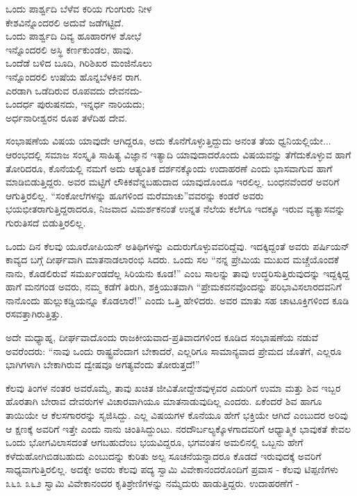 \begin{myquote}
ಒಂದು ಪಾರ್ಶ್ವದಿ ಬೆಳೆವ ಕರಿಯ ಗುಂಗುರು ನೀಳ\\ಕೇಶವಿನ್ನೊಂದರಲಿ ಅದುವೆ ಜಡೆಗಟ್ಟಿದೆ.\\ಒಂದು ಪಾರ್ಶ್ವದಿ ದಿವ್ಯ ಹೂಹಾರಗಳ ಶೋಭೆ\\ಇನ್ನೊಂದರಲಿ ಅಸ್ಥಿ ಕರ್ಣಕುಂಡಲ, ಹಾವು.\\ಒಂದೆಡೆ ಬಳಿದ ಬೂದಿ, ಗಿರಿಶಿಖರ ಮಂಜಿನೊಲು\\ಇನ್ನೊಂದರಲಿ ಉಷೆಯ ಹೊನ್ನಬೆಳಕಿನ ರಾಗ.\\ಎರಡಾಗಿ ಒಡೆದಿರುವ ರೂಪವದು ದೇವನದು-\\ಒಂದರ್ಧ ಪುರುಷನದು, ಇನ್ನರ್ಧ ನಾರಿಯದು;\\ಅರ್ಧನಾರೀಶ್ವರನ ರೂಪ ತಳೆದಿಹ ದೇವ.
\end{myquote}

ಸಂಭಾಷಣೆಯ ವಿಷಯ ಯಾವುದೇ ಆಗಿದ್ದರೂ, ಅದು ಕೊನೆಗೊಳ್ಳುತ್ತಿದ್ದುದು ಅನಂತ ತೆಯ ಧ್ವನಿಯಲ್ಲಿಯೇ... ಆರಂಭದಲ್ಲಿ ಸಮಾಜ ಸಂಸ್ಕೃತಿ ಸಾಹಿತ್ಯ ವಿಜ್ಞಾನ ಇತ್ಯಾದಿ ಯಾವುದಾದರೊಂದು ವಿಷಯವನ್ನು ತೆಗೆದುಕೊಳ್ಳುವ ಹಾಗೆ ತೋರಿದರೂ, ಕೊನೆಯಲ್ಲಿ ನಮಗೆ ಅದು ಆತ್ಯಂತಿಕ ದರ್ಶನಕ್ಕೊಂದು ಉದಾಹರಣೆ ಎಂದು ಭಾಸವಾಗುವ ಹಾಗೆ ಮಾಡಿಬಿಡುತ್ತಿದ್ದರು. ಅವರ ಮಟ್ಟಿಗೆ ಲೌಕಿಕವೆನ್ನಬಹುದಾದ ಯಾವುದೊಂದೂ ಇರಲಿಲ್ಲ. ಬಂಧನವೆಂದರೆ ಅವರಿಗೆ ಆಗುತ್ತಿರಲಿಲ್ಲ. “ಸಂಕೋಲೆಗಳನ್ನು ಹೂಗಳಿಂದ ಮರೆಮಾಚು”ವವರನ್ನು ಕಂಡರೆ ಅವರು ಭಯಭೀತರಾಗುತ್ತಿದ್ದರಾದರೂ, ನಿಜವಾದ ವಿಮರ್ಶಕನಂತೆ ಉನ್ನತ ನೆಲೆಯ ಕಲೆಗೂ ಇದಕ್ಕೂ ಇರುವ ವ್ಯತ್ಯಾಸವನ್ನು ಗುರುತಿಸದೆ ಬಿಡುತ್ತಿರಲಿಲ್ಲ.

ಒಂದು ದಿನ ಕೆಲವು ಯೂರೋಪಿಯನ್ ಅತಿಥಿಗಳನ್ನು ಎದುರುಗೊಳ್ಳುವವರಿದ್ದೆವು. ಇದಕ್ಕಿದ್ದಂತೆ ಅವರು ಪರ್ಷಿಯನ್ ಕಾವ್ಯದ ಬಗ್ಗೆ ದೀರ್ಘವಾಗಿ ಮಾತನಾಡಲಾರಂಭಿ ಸಿದರು. ಒಂದು ಸಲ “ನನ್ನ ಪ್ರೇಮಿಯ ಮುಖದ ಮಚ್ಚೆಯೊಂದಕೆ ನಾನು, ಕೊಡಲಿರುವೆ ಸಮರ್ಖಂಡದೆಲ್ಲ ಸಿರಿಯನು ಕೂಡ!” ಎಂಬ ಸಾಲನ್ನು ತಾವು ಉದ್ಧರಿಸುತ್ತಿರುವುದನ್ನು ಇದ್ದಕ್ಕಿದ್ದ ಹಾಗೆ ಮನಗಂಡ ಅವರು, ನಮ್ಮ ಕಡೆಗೆ ತಿರುಗಿ, ಶಕ್ತಿಯುತವಾಗಿ “ಪ್ರೇಮಕವನವೊಂದನ್ನು ಪರಿಭಾವಿಸಲಾರದವನಿಗೆ ನಾನೊಂದು ಹುಲ್ಲುಕಡ್ಡಿಯನ್ನೂ ಕೊಡಲಾರೆ!” ಎಂದು ಒತ್ತಿ ಹೇಳಿದರು. ಅವರ ಮಾತು ಸಹ ಚಾಟೂಕ್ತಿಗಳಿಂದ ಕೂಡಿ ರಸವತ್ತಾಗಿರುತ್ತಿತ್ತು.

ಅದೇ ಮಧ್ಯಾಹ್ನ, ದೀರ್ಘವಾದೊಂದು ರಾಜಕೀಯವಾದ-ಪ್ರತಿವಾದಗಳಿಂದ ಕೂಡಿದ ಸಂಭಾಷಣೆಯ ನಡುವೆ ಅವರೆಂದರು: “ನಾವು ಒಂದು ರಾಷ್ಟ್ರವೆಂದಾಗ ಬೇಕಾದರೆ, ಎಲ್ಲರಿಗೂ ಸಾಮಾನ್ಯವಾದ ಪ್ರೇಮದ ಜೊತೆಗೆ, ಎಲ್ಲರೂ ಭಾಗಿಗಳಾಗಿ ಬೇಕಾಗಿರುವ ದ್ವೇಷವೂ ಅಗತ್ಯವೆಂದು ತೋರುತ್ತದೆ!”

ಕೆಲವು ತಿಂಗಳ ನಂತರ ಅವರೊಮ್ಮೆ, ತಾವು ಖಚಿತ ಜೀವಿತೋದ್ದೇಶವುಳ್ಳವರ ಎದುರಿಗೆ ಉಮಾ ಮತ್ತು ಶಿವ ಇಬ್ಬರ ಹೊರತಾಗಿ ಬೇರಾವ ದೇವರುಗಳ ವಿಚಾರವಾಗಿಯೂ ಮಾತನಾಡುವುದಿಲ್ಲ ಎಂದರು. ಏಕೆಂದರೆ ಶಿವ ಹಾಗೂ ತಾಯಿಯೇ ಆ ಕೆಲಸಗಾರರನ್ನು ಸೃಜಿಸಿದ್ದು. ಎಲ್ಲ ವಿಷಯಗಳ ಕೊನೆಯೂ ಹೇಗೆ ಭಕ್ತಿಯೇ ಆಗಿದೆ ಎಂಬುದರ ಅರಿವು ಆ ಕ್ಷಣಕ್ಕೆ ಅವರಿಗೆ ಇತ್ತೇ ಎಂದು ನಾನು ಚಿಂತಿಸಿದ್ದುಂಟು. ನರದೌರ್ಬಲ್ಯಕ್ಕೊಳಗಾದವರಿಗೆ ಆಧ್ಯಾತ್ಮಿಕ ಭಾವುಕತೆ ಕೇವಲ ಒಂದು ಭೋಗವಿಲಾಸದಂತೆ ಆಗಬಹುದೆಂಬ ಭಯವಿದ್ದರೂ, ಭಗವಂತನ ಅಮಲಿನಲ್ಲಿ ಒಬ್ಬನು ಹೇಗೆ ಕಳೆದುಹೋಗಿಬಿಡಬಹುದು ಎಂಬುದನ್ನು ಕುರಿತು ಅಲ್ಪ ಸೂಚನೆಯನ್ನಾದರೂ ಕೊಡದೆ ಇರುವುದಕ್ಕೆ ಅವರಿಗೆ ಸಾಧ್ಯವಾಗುತ್ತಿರಲಿಲ್ಲ. ಅದಕ್ಕೇ ಅವರು ಕೆಲವು ಪದ್ಯ ಸ್ವಾಮಿ ವಿವೇಕಾನಂದರೊಂದಿಗೆ ಪ್ರವಾಸ - ಕೆಲವು ಟಿಪ್ಪಣಿಗಳು ೩೬೩ ೩೬೨ ಸ್ವಾಮಿ ವಿವೇಕಾನಂದರ ಕೃತಿಶ್ರೇಣಿಗಳನ್ನು ನಮ್ಮೆದುರು ಹಾಡುತ್ತಿದ್ದರು. ಉದಾಹರಣೆಗೆ -

